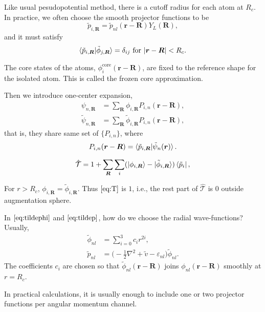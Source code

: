 Like usual pesudopotential method, there is a cutoff radius for each atom at $R_c$.
In practice, we often choose the smooth projector functions to be
\cite{Mortensen:2005ep,rostgaard2009projector}
\begin{equation}
	\tilde{p}_{i, \bm{R}} = \tilde{p}_{nl} (\bm{r} - \bm{R}) Y_L (\bm{R}),
	\label{eq:tildep}
\end{equation}
and it must satisfy
\begin{equation}
	\braket{ \tilde{p}_{i, \bm{R}} | \tilde{\phi}_{j, \bm{R}} } = \delta_{ij}
	\text{ for } \abs{\bm{r} - \bm{R}} < R_c.
\end{equation}

The core states of the atoms, $\phi_{i}^\text{core}(\bm{r} - \bm{R})$,
are fixed to the reference shape for the isolated atom. This is called the
frozen core approximation.\cite{rostgaard2009projector}


Then we introduce one-center expansion,
\begin{align}
	\psi_{n, \bm{R}}         & = \sum_{\bm{R}} \phi_{i, \bm{R}} P_{i, n} (\bm{r} - \bm{R}), \\
	\tilde{\psi}_{n, \bm{R}} & =
	\sum_{\bm{R}} \tilde{\phi} _{i, \bm{R}} P_{i, n} (\bm{r} - \bm{R}),
\end{align}
that is, they share same set of $\{ P_{i, n} \}$, where
\begin{equation}
	P_{i, n} (\bm{r} - \bm{R}) = \braket{ \tilde{p}_{i, \bm{R}} | \tilde{\psi}_n (\bm{r}) }.
\end{equation}


\begin{equation}\label{eq:T}
	\hat{\mathcal{T}} = 1 + \sum_{\bm{R}} \sum_{i}
	(\ket{\phi_{i, \bm{R}}} - \ket{\tilde{\phi}_{i, \bm{R}}}) \bra{\tilde{p}_i},
\end{equation}


For $r > R_c$, $\phi_{i, \bm{R}} = \tilde{\phi}_{i, \bm{R}}$. Thus $\eqref{eq:T}$ is
$1$, i.e., the rest part of $\hat{\mathcal{T}}$ is $0$ outside augmentation sphere.


In $\eqref{eq:tildephi}$ and $\eqref{eq:tildep}$, how do we choose the radial
wave-functions? Usually,
\begin{align}
	\tilde{\phi}_{nl} & = \sum_{i=0}^{3} c_i r^{2i},                    \\
	\tilde{p}_{nl}    & = \bigg( -\frac{ 1 }{ 2 }\nabla^2 + \tilde{v} -
	\varepsilon_{nl} \bigg) \tilde{\phi}_{nl}.
\end{align}
The coefficients $c_i$ are chosen so that $\tilde{\phi}_{nl}(\bm{r} - \bm{R})$ joins
$\phi_{nl}(\bm{r} - \bm{R})$ smoothly at $r = R_c$.


In practical calculations, it is usually enough to include one or two
projector functions per angular momentum channel.\cite{Enkovaara:2010jd}


